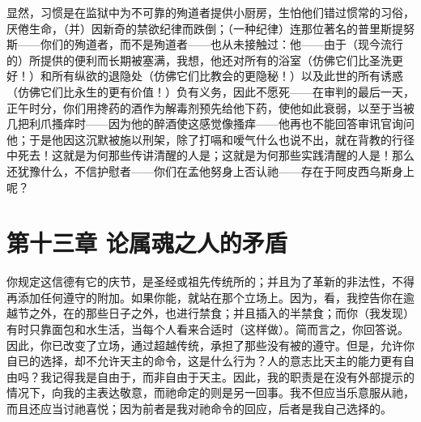 显然，习惯是在监狱中为不可靠的殉道者提供小厨房，生怕他们错过惯常的习俗，厌倦生命，（并）因新奇的禁欲纪律而跌倒；（一种纪律）连那位著名的普里斯提努斯——你们的殉道者，而不是殉道者——也从未接触过：他——由于（现今流行的）所提供的便利而长期被塞满，我想，他还对所有的浴室（仿佛它们比圣洗更好！）和所有纵欲的退隐处（仿佛它们比教会的更隐秘！）以及此世的所有诱惑（仿佛它们比永生的更有价值！）负有义务，因此不愿死——在审判的最后一天，正午时分，你们用搀药的酒作为解毒剂预先给他下药，使他如此衰弱，以至于当被几把利爪搔痒时——因为他的醉酒使这感觉像搔痒——他再也不能回答审讯官询问他；于是他因这沉默被施以刑架，除了打嗝和嗳气什么也说不出，就在背教的行径中死去！这就是为何那些传讲清醒的人是；这就是为何那些实践清醒的人是！那么还犹豫什么，不信护慰者——你们在孟他努身上否认祂——存在于阿皮西乌斯身上呢？\par


\section{第十三章  论属魂之人的矛盾}

你规定这信德有它的庆节，是圣经或祖先传统所的；并且为了革新的非法性，不得再添加任何遵守的附加。如果你能，就站在那个立场上。因为，看，我控告你在逾越节之外，在的那些日子之外，也进行禁食；并且插入的半禁食；而你（我发现）有时只靠面包和水生活，当每个人看来合适时（这样做）。简而言之，你回答说。因此，你已改变了立场，通过超越传统，承担了那些没有被的遵守。但是，允许你自已的选择，却不允许天主的命令，这是什么行为？人的意志比天主的能力更有自由吗？我记得我是自由于，而非自由于天主。因此，我的职责是在没有外部提示的情况下，向我的主表达敬意，而祂命定的则是另一回事。我不但应当乐意服从祂，而且还应当讨祂喜悦；因为前者是我对祂命令的回应，后者是我自己选择的。\par

